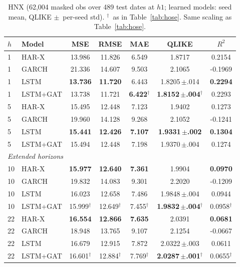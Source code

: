 \documentclass[runningheads]{llncs}
\begin{document}
\begin{table}[t]
\centering
\caption{HNX (62{,}004 masked obs over 489 test dates at $h1$; learned models: seed mean, QLIKE
$\pm$~per-seed std). $^{\dagger}$~as in Table~\ref{tab:hose}. Same scaling as Table~\ref{tab:hose}.}
\label{tab:hnx}
\footnotesize
\setlength{\tabcolsep}{5pt}
\begin{tabular}{llccccc}
\toprule
$h$ & Model & MSE & RMSE & MAE & QLIKE & $R^2$ \\
\midrule
1  & HAR-X    & 13.986 & 11.826 & 6.549 & 1.8717 & 0.2154 \\
1  & GARCH    & 21.336 & 14.607 & 9.503 & 2.1065 & -0.1969 \\
1  & LSTM     & \textbf{13.736} & \textbf{11.720} & 6.443 & 1.8205\,$\pm$.014 & \textbf{0.2294} \\
1  & LSTM+GAT & 13.738 & 11.721 & \textbf{6.422}$^{\dagger}$ & \textbf{1.8152\,$\pm$.004}$^{\dagger}$ & 0.2293 \\
\midrule
5  & HAR-X    & 15.495 & 12.448 & 7.123 & 1.9402 & 0.1273 \\
5  & GARCH    & 19.960 & 14.128 & 9.268 & 2.1052 & -0.1241 \\
5  & LSTM     & \textbf{15.441} & \textbf{12.426} & \textbf{7.107} & \textbf{1.9331\,$\pm$.002} & \textbf{0.1304} \\
5  & LSTM+GAT & 15.494 & 12.448 & 7.198 & 1.9370\,$\pm$.004 & 0.1274 \\
\midrule
\multicolumn{7}{l}{\emph{Extended horizons}}\\
10 & HAR-X    & \textbf{15.977} & \textbf{12.640} & \textbf{7.361} & 1.9904 & \textbf{0.0970} \\
10 & GARCH    & 19.832 & 14.083 & 9.301 & 2.2020 & -0.1209 \\
10 & LSTM     & 16.023 & 12.658 & 7.486 & 1.9848\,$\pm$.004 & 0.0944 \\
10 & LSTM+GAT & 15.999$^{\dagger}$ & 12.649$^{\dagger}$ & 7.455$^{\dagger}$ & \textbf{1.9832\,$\pm$.004}$^{\dagger}$ & 0.0958$^{\dagger}$ \\
\midrule
22 & HAR-X    & \textbf{16.554} & \textbf{12.866} & \textbf{7.635} & 2.0391 & \textbf{0.0681} \\
22 & GARCH    & 18.948 & 13.765 & 9.107 & 2.1254 & -0.0667 \\
22 & LSTM     & 16.679 & 12.915 & 7.872 & 2.0322\,$\pm$.003 & 0.0611 \\
22 & LSTM+GAT & 16.601$^{\dagger}$ & 12.884$^{\dagger}$ & 7.769$^{\dagger}$ & \textbf{2.0287\,$\pm$.001}$^{\dagger}$ & 0.0655$^{\dagger}$ \\
\bottomrule
\end{tabular}
\end{table}
\end{document}
